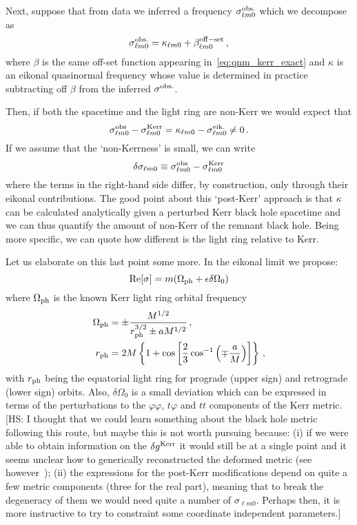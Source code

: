 \documentclass[aps,prd,10pt,preprint,
               notitlepage,onecolumn,superscriptaddress,
               eqsecnum,
               nofootinbib,tightenlines,floatfix]{revtex4-2}
\newcommand{\hs}[1]{{\color{magenta}[HS: #1]}}
\begin{document}
Next, suppose that from data we inferred a frequency $\sigma_{\ell m 0}^{\rm obs.}$
which we decompose as
%
\begin{equation}
    \sigma_{\ell m 0}^{\rm obs.} = \kappa_{\ell m 0} + \beta_{\ell m 0}^{\rm off-set}\,,
\end{equation}
%
where $\beta$ is the same off-set function appearing
in~\eqref{eq:qnm_kerr_exact} and $\kappa$ is an eikonal quasinormal frequency
whose value is determined in practice subtracting off $\beta$ from the inferred
$\sigma^{\rm obs.}$.

Then, if both the spacetime and the light ring are non-Kerr
we would expect that
%
\begin{equation}
    \sigma_{\ell m 0}^{\rm obs} - \sigma_{\ell m 0}^{\rm Kerr} = \kappa_{\ell m 0} - \sigma^{\rm eik.}_{\ell m 0} \neq 0 \,.
    \label{eq:qnm_obs}
\end{equation}
%
If we assume that the `non-Kerrness' is small, we can write
%
\begin{equation}
    \delta \sigma_{\ell m 0} \equiv  \sigma_{\ell m 0}^{\rm obs} - \sigma_{\ell m 0}^{\rm Kerr}
\end{equation}
%
where the terms in the right-hand side differ, by construction, only through their eikonal contributions.
%
The good point about this `post-Kerr' approach is that $\kappa$ can be
calculated analytically given a perturbed Kerr black hole spacetime and we can
thus quantify the amount of non-Kerr of the remnant black hole.
%
Being more specific, we can quote how different is the light ring relative to Kerr.

Let us elaborate on this last point some more. In the eikonal limit we propose:
%
\begin{equation}
    {\rm Re}[\sigma] = m (\Omega_{\rm ph} + \epsilon \delta \Omega_0)
\end{equation}
%
where $\Omega_{\rm ph}$ is the known Kerr light ring orbital frequency
%
\begin{align}
    \Omega_{\rm ph} &= \pm \frac{M^{1/2}}{r_{\rm ph}^{3/2} \pm a M^{1/2}} \,,
    \\
    r_{\rm ph} &= 2M \left\{
    1 + \cos\left[ \frac{2}{3} \cos^{-1} \left( \mp \frac{a}{M} \right)\right]
    \right\}\,,
\end{align}
%
with $r_{\rm ph}$ being the equatorial light ring for prograde (upper sign) and
retrograde (lower sign) orbits. Also, $\delta \Omega_0$ is a small deviation
which can be expressed in terms of the perturbations to the $\varphi\varphi$,
$t\varphi$ and $tt$ components of the Kerr metric.
%
\hs{I thought that we could learn something about the black hole metric
following this route, but maybe this is not worth pursuing because:
%
(i) if we were able to obtain information on the $\delta g^{\rm Kerr}$
it would still be at a single point and it seems unclear how to generically reconstructed
the deformed metric (see however~\cite{Volkel:2020daa});
%
(ii) the expressions for the post-Kerr modifications depend on quite a few
metric components (three for the real part), meaning that to break the degeneracy of
them we would need quite a number of $\sigma_{\ell m 0}$.
%
Perhaps then, it is more instructive to try to constraint some coordinate independent
parameters.}
%
\end{document}
